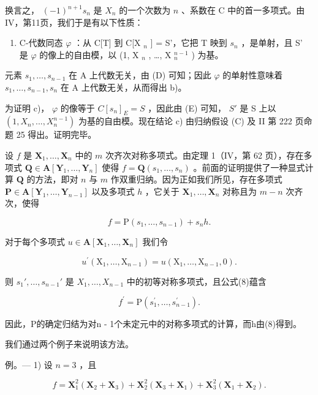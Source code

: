 换言之， \((-1)^{n + 1}s_n\) 是 \(X_{n}\) 的一个次数为 \(n\) 、系数在 C 中的首一多项式。由IV，第11页，我们于是有以下性质：

\begin{enumerate}
\def\labelenumi{(\Alph{enumi})}
\setcounter{enumi}{4}
\tightlist
\item
  C-代数同态 \(\varphi\) ：从 C{[}T{]} 到 C{[}X \(_n\) {]} = S'，它把 T 映到 \(s_n\) ，是单射，且 S' 是 \(\varphi\) 的像上的自由模，以 (1, X \(_n\) , \ldots, X \(_n^{n-1}\) ) 为基。
\end{enumerate}

元素 \(s_{1}, \ldots, s_{n-1}\) 在 A 上代数无关，由 (D) 可知；因此 \(\varphi\) 的单射性意味着 \(s_{1}, \ldots, s_{n-1}, s_{n}\) 在 A 上代数无关，从而得出 b)。

为证明 c)， \(\varphi\) 的像等于 \(C[s_{n}]_{E} = S\) ，因此由 (E) 可知， \(S'\) 是 S 上以 \((1, X_{n}, ..., X_{n}^{n-1})\) 为基的自由模。现在结论 c) 由归纳假设 (C) 及 II 第 222 页命题 25 得出。证明完毕。

设 \(f\) 是 \(\mathbf{X}_1, \ldots, \mathbf{X}_n\) 中的 \(m\) 次齐次对称多项式。由定理 1（IV，第 62 页），存在多项式 \(\mathbf{Q} \in \mathbf{A}[\mathbf{Y}_1, \ldots, \mathbf{Y}_n]\) 使得 \(f = \mathbf{Q}(s_1, \ldots, s_n)\) 。前面的证明提供了一种显式计算 \(\mathbf{Q}\) 的方法，即对 \(n\) 与 \(m\) 作双重归纳。因为正如我们所见，存在多项式 \(\mathbf{P} \in \mathbf{A}[\mathbf{Y}_1, \ldots, \mathbf{Y}_{n-1}]\) 以及多项式 \(h\) ，它关于 \(\mathbf{X}_1, \ldots, \mathbf{X}_n\) 对称且为 \(m - n\) 次齐次，使得

\[
f = \mathrm{P} (s _ {1}, \dots , s _ {n - 1}) + s _ {n} h.\tag{8}
\]

对于每个多项式 \(u \in \mathbf{A}[\mathbf{X}_1, \ldots, \mathbf{X}_n]\) 我们令

\[
u ^ {\prime} \left(\mathrm{X} _ {1}, \dots , \mathrm{X} _ {n - 1}\right) = u \left(\mathrm{X} _ {1}, \dots , \mathrm{X} _ {n - 1}, 0\right).
\]

则 \(s_1', \ldots, s_{n-1}'\) 是 \(X_1, \ldots, X_{n-1}\) 中的初等对称多项式，且公式(8)蕴含

\[
f ^ {\prime} = \mathrm{P} \left(s _ {1} ^ {\prime}, \dots , s _ {n - 1} ^ {\prime}\right).
\]

因此，P的确定归结为对n - 1个未定元中的对称多项式的计算，而h由(8)得到。

我们通过两个例子来说明该方法。

例。--- 1) 设 \(n = 3\) ，且

\[
f = \mathbf {X} _ {1} ^ {2} (\mathbf {X} _ {2} + \mathbf {X} _ {3}) + \mathbf {X} _ {2} ^ {2} (\mathbf {X} _ {3} + \mathbf {X} _ {1}) + \mathbf {X} _ {3} ^ {2} (\mathbf {X} _ {1} + \mathbf {X} _ {2}).
\]

